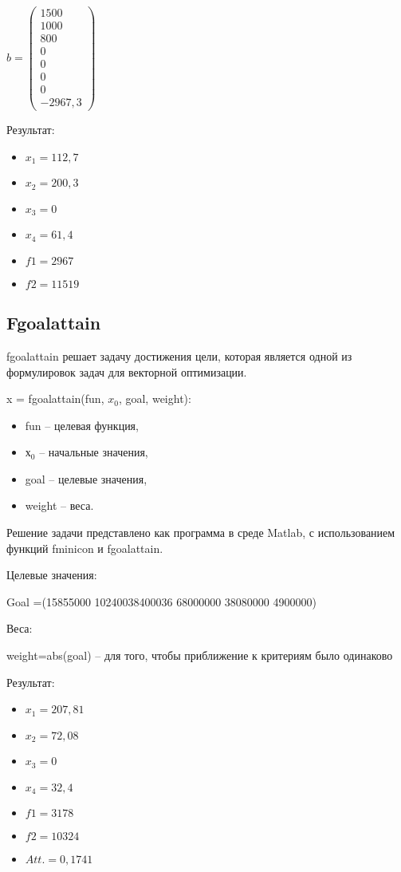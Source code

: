 $b =
\begin{pmatrix}
  1500 \\
  1000 \\
  800 \\
  0 \\
  0 \\
  0 \\
  0 \\
  -2967,3
\end{pmatrix}$

Результат:
\begin{itemize}
\item $x_1 = 112,7$
\item $x_2 = 200,3$
\item $x_3 = 0$
\item $x_4 = 61,4$
\item $f1 = 2967$
\item $f2 = 11519$
\end{itemize}

\subsection{Fgoalattain}

fgoalattain решает задачу достижения цели, которая является одной из формулировок задач для векторной оптимизации.

x = fgoalattain(fun, $x_0$, goal, weight):
\begin{itemize}
\item fun -- целевая функция, 
\item $х_0$ -- начальные значения,
\item goal -- целевые значения,
\item weight -- веса.
\end{itemize}

Решение задачи представлено как программа в среде Matlab, с использованием функций fminicon и fgoalattain.

Целевые значения:

Goal =(15855000 10240038400036 68000000 38080000 4900000) 

Веса:

weight=abs(goal) -- для того, чтобы приближение к критериям было одинаково



Результат:
\begin{itemize}
\item $x_1 = 207,81$
\item $x_2 = 72,08$
\item $x_3 = 0$
\item $x_4 = 32,4$
\item $f1 = 3178$
\item $f2 = 10324$
\item $Att. = 0,1741$
\end{itemize}

